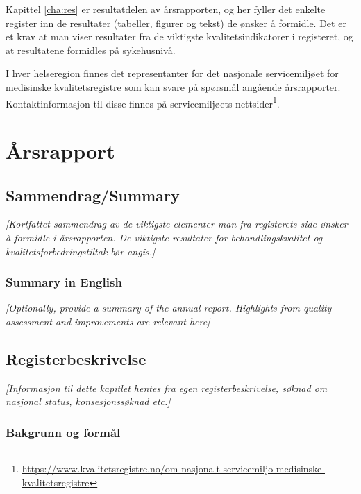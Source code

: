 \documentclass[norsk, a4paper, twocolumn]{report}
\newcommand{\guide}[1] {
	\textit{[\textcolor{guidegray}{#1}]}
	}
\begin{document}
Kapittel \ref{cha:res} er resultatdelen av årsrapporten, og her fyller det
enkelte register inn de resultater (tabeller, figurer og tekst) de ønsker å
formidle. Det er et krav at man viser resultater fra de viktigste
kvalitetsindikatorer i registeret, og at resultatene formidles på
sykehusnivå.

I hver helseregion finnes det representanter for det nasjonale
servicemiljøet for medisinske kvalitetsregistre som kan svare på spørsmål
angående årsrapporter. Kontaktinformasjon til disse finnes på
servicemiljøets \href{https://www.kvalitetsregistre.no/om-nasjonalt-servicemiljo-medisinske-kvalitetsregistre}{nettsider}\footnote{\url{https://www.kvalitetsregistre.no/om-nasjonalt-servicemiljo-medisinske-kvalitetsregistre}}.




\tableofcontents




\part{Årsrapport}\label{par:rap}
\thispagestyle{empty}
\twocolumn



\chapter{Sammendrag/Summary}
\guide{Kortfattet sammendrag av de viktigste elementer man fra registerets side
ønsker å formidle i årsrapporten. De viktigste resultater for
behandlingskvalitet og kvalitetsforbedringstiltak bør angis.}

\section*{Summary in English}
\guide{Optionally, provide a summary of the annual report. Highlights from
quality assessment and improvements are relevant here}


\chapter{Registerbeskrivelse}\label{cha:reg}
\guide{Informasjon til dette kapitlet hentes fra egen registerbeskrivelse,
søknad om nasjonal status, konsesjonssøknad etc.}

\section{Bakgrunn og formål}
\end{document}
